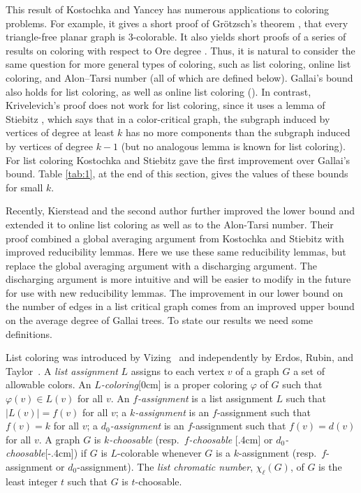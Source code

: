 \documentclass[12pt]{article}
\theoremstyle{plain}
\theoremstyle{definition}
\theoremstyle{remark}
\def\chil{{\chi_\ell}}
\newcommand{\aside}[1]{\marginnote{\scriptsize{#1}}[0cm]}
\newcommand{\aaside}[2]{\marginnote{\scriptsize{#1}}[#2]}
\begin{document}
This result of Kostochka and Yancey has numerous applications to coloring problems.
For example, it gives a short proof of Gr\"otzsch's theorem
\cite{kostochka2012oregrotsch}, that every
triangle-free planar graph is 3-colorable.  It also 
 yields short proofs of a series of results on coloring with
respect to Ore degree \cite{kierstead2009ore, rabern2010a, krs_one}. 
%
Thus,
it is natural to consider the same question for more general types of coloring,
such as list coloring, online list coloring, and Alon--Tarsi number (all of
which are defined below).
Gallai's bound
\cite{gallai1963kritische} also holds for list coloring, as well as online list coloring
(\cite{kostochkastiebitzedgesincriticalgraph, riasat2012critically}). 
In contrast,
Krivelevich's proof \cite{krivelevich1997minimal} does not work for list
coloring, since it uses a lemma of Stiebitz \cite{stiebitz1982proof}, which says that
in a color-critical graph, the subgraph induced by vertices of degree at least
$k$ has no more components than the subgraph induced by vertices of degree
$k-1$ (but no analogous lemma is known for list coloring). For list coloring Kostochka and Stiebitz
\cite{kostochkastiebitzedgesincriticalgraph} gave the first improvement over
Gallai's bound. 
Table \ref{tab:1}, at the end of this section, gives the values of these bounds
for small $k$. 

Recently, Kierstead and the
second author \cite{OreVizing} further improved the lower bound and extended it
to online list coloring as well as to the Alon-Tarsi number.  Their proof combined
a global averaging argument from Kostochka and Stiebitz
\cite{kostochkastiebitzedgesincriticalgraph} with improved reducibility lemmas.
 Here we use these same reducibility lemmas, but replace the global averaging
argument with a discharging argument.  The discharging argument is more
intuitive and will be easier to modify in the future for use with new
reducibility lemmas.  The improvement in our lower bound on the number of edges
in a list critical graph comes from an improved upper bound on the average
degree of Gallai trees.  To state our results we need some definitions.


List coloring was introduced by Vizing~\cite{vizing1976} and independently by Erdos,
Rubin, and Taylor~\cite{erdos1979choosability}.
A \emph{list assignment} $L$ assigns to each vertex $v$ of a graph $G$ a set of
allowable colors.  An \emph{$L$-coloring}\aside{$L$-coloring} is a proper
coloring $\varphi$ of $G$ such that $\varphi(v)\in L(v)$ for all $v$.  An
\emph{$f$-assignment} is a list assignment $L$ such that $|L(v)|=f(v)$ for all
$v$; a \emph{$k$-assignment} is an $f$-assignment such that $f(v)=k$ for all
$v$; a \emph{$d_0$-assignment} is an $f$-assignment such that $f(v)=d(v)$ for
all $v$.
A graph $G$ is \emph{$k$-choosable} (resp.~\emph{$f$-choosable}
\aaside{$f$-choosable}{.4cm} or
\emph{$d_0$-choosable}\aaside{$d_0$-choosable}{-.4cm}) if $G$
is $L$-colorable whenever $G$ is a $k$-assignment (resp.~$f$-assignment or
$d_0$-assignment).  The \emph{list chromatic number}, $\chil(G)$, of $G$ is the
least integer $t$ such that $G$ is $t$-choosable.  
\end{document}
